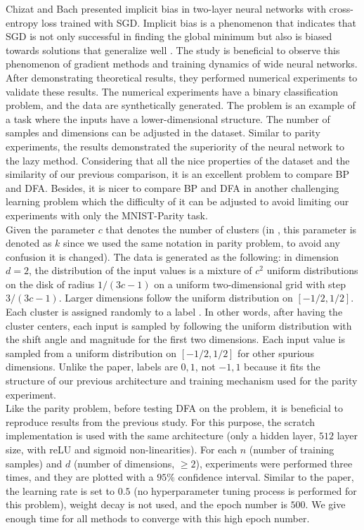 \documentclass[a4paper, nobind]{templates/ociamthesis}
\begin{document}
Chizat and Bach \cite{chizat2020implicit} presented implicit bias in two-layer neural networks with cross-entropy loss trained with SGD. Implicit bias is a phenomenon that indicates that SGD is not only successful in finding the global minimum but also is biased towards solutions that generalize well \cite{yun2021unifying}. The study is beneficial to observe this phenomenon of gradient methods and training dynamics of wide neural networks. After demonstrating theoretical results, they performed numerical experiments to validate these results. The numerical experiments have a binary classification problem, and the data are synthetically generated. The problem is an example of a task where the inputs have a lower-dimensional structure. The number of samples and dimensions can be adjusted in the dataset. Similar to parity experiments, the results demonstrated the superiority of the neural network to the lazy method. Considering that all the nice properties of the dataset and the similarity of our previous comparison, it is an excellent problem to compare BP and DFA. Besides, it is nicer to compare BP and DFA in another challenging learning problem which the difficulty of it can be adjusted to avoid limiting our experiments with only the MNIST-Parity task.\\
\noindent Given the parameter \(c\) that denotes the number of clusters (in \cite{chizat2020implicit}, this parameter is denoted as \(k\) since we used the same notation in parity problem, to avoid any confusion it is changed). The data is generated as the following: in dimension \(d=2\), the distribution of the input values is a mixture of \(c^2\) uniform distributions on the disk of radius \(1/ (3c-1)\) on a uniform two-dimensional grid with step \(3/(3c-1)\). Larger dimensions follow the uniform distribution on \([-1/2,1/2]\). Each cluster is assigned randomly to a label \cite{chizat2020implicit}. In other words, after having the cluster centers, each input is sampled by following the uniform distribution with the shift angle and magnitude for the first two dimensions. Each input value is sampled from a uniform distribution on \([-1/2,1/2]\) for other spurious dimensions. Unlike the paper, labels are \(0,1\), not \(-1,1\) because it fits the structure of our previous architecture and training mechanism used for the parity experiment.\\
Like the parity problem, before testing DFA on the problem, it is beneficial to reproduce results from the previous study. For this purpose, the scratch implementation is used with the same architecture (only a hidden layer, \(512\) layer size, with reLU and sigmoid non-linearities). For each \(n\) (number of training samples) and \(d\) (number of dimensions, \(\geq2\)), experiments were performed three times, and they are plotted with a \(95\%\) confidence interval. Similar to the paper, the learning rate is set to \(0.5\) (no hyperparameter tuning process is performed for this problem), weight decay is not used, and the epoch number is \(500\). We give enough time for all methods to converge with this high epoch number.
\end{document}
